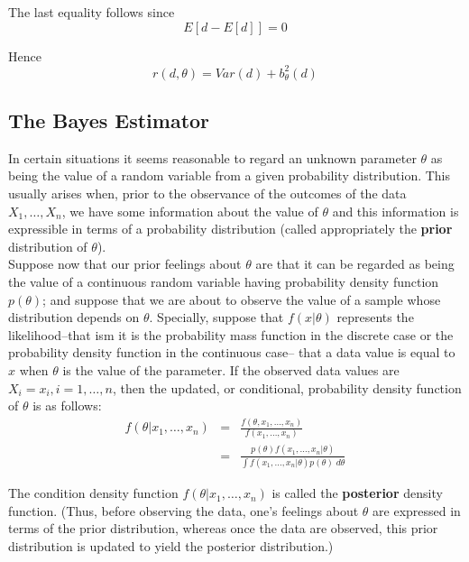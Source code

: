 \documentclass[12pt]{article}
\begin{document}
The last equality follows since
\begin{equation*}
  E[d - E[d]] = 0
\end{equation*}

Hence
\begin{equation*}
  r(d, \theta) = Var(d) + b_{\theta}^2 (d)
\end{equation*}

\subsection{The Bayes Estimator}

In certain situations it seems reasonable to regard an unknown parameter $\theta$ as being the value of a random variable from a given probability distribution. This usually arises when, prior to the observance of the outcomes of the data $X_1, \dots, X_n$, we have some information about the value of $\theta$ and this information is expressible in terms of a probability distribution (called appropriately the \textbf{prior} distribution of $\theta$). \\

Suppose now that our prior feelings about $\theta$ are that it can be regarded as being the value of a continuous random variable having probability density function $p(\theta)$; and suppose that we are about to observe the value of a sample whose distribution depends on $\theta$. Specially, suppose that $f(x | \theta)$ represents the likelihood--that ism it is the probability mass function in the discrete case or the probability density function in the continuous case-- that a data value is equal to $x$ when $\theta$ is the value of the parameter. If the observed data values are $X_i = x_i, i =1,\dots,n$, then the updated, or conditional, probability density function of $\theta$ is as follows:
\begin{eqnarray*}
  f(\theta | x_1, \dots, x_n)
  &=& \frac {f(\theta, x_1, \dots, x_n)}{f(x_1, \dots, x_n)} \\
  &=& \frac {p(\theta) f(x_1, \dots, x_n | \theta)}
  {\int f(x_1, \dots, x_n | \theta) p(\theta) \; d \theta}
\end{eqnarray*}

The condition density function $f(\theta | x_1, \dots, x_n)$ is called the \textbf{posterior} density function. (Thus, before observing the data, one's feelings about $\theta$ are expressed in terms of the prior distribution, whereas once the data are observed, this prior distribution is updated to yield the posterior distribution.) \\
\end{document}
